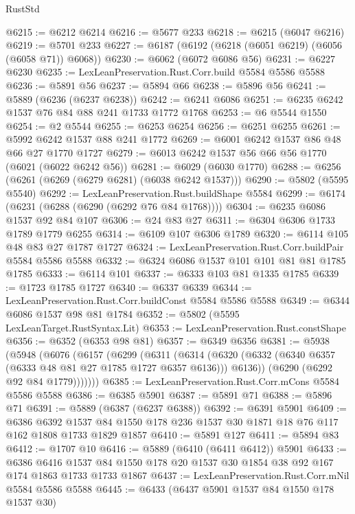 \begin{lexlean}{RustStd}
\begin{coremodule}
@6215 := @6212 @6214
@6216 := @5677 @233
@6218 := @6215 (@6047 @6216)
@6219 := @5701 @233
@6227 := @6187 (@6192 (@6218 (@6051 @6219) (@6056 (@6058 @71)) @6068))
@6230 := @6062 (@6072 @6086 @56)
@6231 := @6227 @6230
@6235 := LexLeanPreservation.Rust.Corr.build @5584 @5586 @5588
@6236 := @5891 @56
@6237 := @5894 @66
@6238 := @5896 @56
@6241 := @5889 (@6236 (@6237 @6238))
@6242 := @6241 @6086
@6251 := @6235 @6242 @1537 @76 @84 @88 @241 @1733 @1772 @1768
@6253 := @6 @5544 @1550
@6254 := @2 @5544
@6255 := @6253 @6254
@6256 := @6251 @6255
@6261 := @5992 @6242 @1537 @88 @241 @1772
@6269 := @6001 @6242 @1537 @86 @48 @66 @27 @1770 @1727
@6279 := @6013 @6242 @1537 @56 @66 @56 @1770 (@6021 (@6022 @6242 @56))
@6281 := @6029 (@6030 @1770)
@6288 := @6256 (@6261 (@6269 (@6279 @6281) (@6038 @6242 @1537)))
@6290 := @5802 (@5595 @5540)
@6292 := LexLeanPreservation.Rust.buildShape @5584
@6299 := @6174 (@6231 (@6288 (@6290 (@6292 @76 @84 @1768))))
@6304 := @6235 @6086 @1537 @92 @84 @107
@6306 := @24 @83 @27
@6311 := @6304 @6306 @1733 @1789 @1779 @6255
@6314 := @6109 @107 @6306 @1789
@6320 := @6114 @105 @48 @83 @27 @1787 @1727
@6324 := LexLeanPreservation.Rust.Corr.buildPair @5584 @5586 @5588
@6332 := @6324 @6086 @1537 @101 @101 @81 @81 @1785 @1785
@6333 := @6114 @101
@6337 := @6333 @103 @81 @1335 @1785
@6339 := @1723 @1785 @1727
@6340 := @6337 @6339
@6344 := LexLeanPreservation.Rust.Corr.buildConst @5584 @5586 @5588
@6349 := @6344 @6086 @1537 @98 @81 @1784
@6352 := @5802 (@5595 LexLeanTarget.RustSyntax.Lit)
@6353 := LexLeanPreservation.Rust.constShape
@6356 := @6352 (@6353 @98 @81)
@6357 := @6349 @6356
@6381 := @5938
    (@5948
      (@6076
        (@6157
          (@6299
            (@6311
              (@6314
                (@6320 (@6332 (@6340 @6357 (@6333 @48 @81 @27 @1785 @1727 @6357 @6136))) @6136))
              (@6290 (@6292 @92 @84 @1779)))))))
@6385 := LexLeanPreservation.Rust.Corr.mCons @5584 @5586 @5588
@6386 := @6385 @5901
@6387 := @5891 @71
@6388 := @5896 @71
@6391 := @5889 (@6387 (@6237 @6388))
@6392 := @6391 @5901
@6409 := @6386
    @6392
    @1537
    @84
    @1550
    @178
    @236
    @1537
    @30
    @1871
    @18
    @76
    @117
    @162
    @1808
    @1733
    @1829
    @1857
@6410 := @5891 @127
@6411 := @5894 @83
@6412 := @1707 @10
@6416 := @5889 (@6410 (@6411 @6412)) @5901
@6433 := @6386
    @6416
    @1537
    @84
    @1550
    @178
    @20
    @1537
    @30
    @1854
    @38
    @92
    @167
    @174
    @1863
    @1733
    @1733
    @1867
@6437 := LexLeanPreservation.Rust.Corr.mNil @5584 @5586 @5588
@6445 := @6433 (@6437 @5901 @1537 @84 @1550 @178 @1537 @30)

\end{coremodule}
\end{lexlean}
